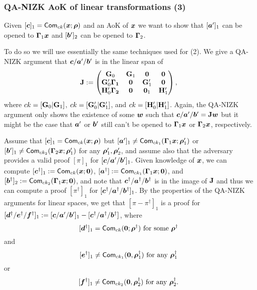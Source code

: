 \subsubsection{QA-NIZK AoK of linear transformations (3)}
Given $[{\boldsymbol{c}}]_1=\mathsf{Com}_{ck}({\boldsymbol{x}};{\boldsymbol{\rho}})$ and an AoK of ${\boldsymbol{x}}$ we want to show that $[{\boldsymbol{a}}']_1$ can be opened to $\mathbf{{\Gamma}}_1{\boldsymbol{x}}$ and $[{\boldsymbol{b}}']_2$ can be opened to $\mathbf{{\Gamma}}_2$.

To do so we will use essentially the same techniques used for (2). We give a QA-NIZK argument that ${\boldsymbol{c}}/{\boldsymbol{a}}'/{\boldsymbol{b}}'$ is in the linear span of
$$
\mathbf{{J}}:=
\begin{pmatrix}
\mathbf{{G}}_0                              & \mathbf{{G}}_1 & \mathbf{{0}}      & \mathbf{{0}} \\
\mathbf{{G}}'_0\mathbf{{\Gamma_1}}& \mathbf{{0}}     & \mathbf{{G}}'_1 & \mathbf{{0}} \\
\mathbf{{H}}'_0\mathbf{{\Gamma_2}}& \mathbf{{0}}    & \mathbf{{0}}_1   & \mathbf{{H}}'_1 
\end{pmatrix},
$$
where $ck=[\mathbf{{G}}_0|\mathbf{{G}}_1]$, $ck=[\mathbf{{G}}'_0|\mathbf{{G}}'_1]$, and $ck=[\mathbf{{H}}'_0|\mathbf{{H}}'_1]$.
Again, the QA-NIZK argument only shows the existence of some ${\boldsymbol{w}}$ such that ${\boldsymbol{c}}/{\boldsymbol{a}}'/{\boldsymbol{b}}' = \mathbf{{J}}{\boldsymbol{w}}$ but it might be the case that ${\boldsymbol{a}}'$ or ${\boldsymbol{b}}'$ still can't be opened to $\mathbf{{\Gamma}}_1{\boldsymbol{x}}$ or  $\mathbf{{\Gamma}}_2{\boldsymbol{x}}$, respectively.

Assume that $[{\boldsymbol{c}}]_1 = \mathsf{Com}_{ck}({\boldsymbol{x}};{\boldsymbol{\rho}})$ but $[{\boldsymbol{a}}']_1\neq \mathsf{Com}_{ck_1}(\mathbf{{\Gamma}}_1{\boldsymbol{x}};{\boldsymbol{\rho}}'_1)$ or $[{\boldsymbol{b}}']_1\neq \mathsf{Com}_{ck_2}(\mathbf{{\Gamma}}_2{\boldsymbol{x}};{\boldsymbol{\rho}}'_1)$ for any ${\boldsymbol{\rho}}'_1,{\boldsymbol{\rho}}'_2$, and assume also that the adversary provides a valid proof $[\pi]_1$ for $[{\boldsymbol{c}}/{\boldsymbol{a}}'/{\boldsymbol{b}}']_1$. Given knowledge of ${\boldsymbol{x}}$, we can compute $[{\boldsymbol{c}}^\dag]_1:=\mathsf{Com}_{ck}({\boldsymbol{x}};{\boldsymbol{0}})$, $[{\boldsymbol{a}}^\dag]:=\mathsf{Com}_{ck_1}(\mathbf{{\Gamma}}_1{\boldsymbol{x}};{\boldsymbol{0}})$, and $[{\boldsymbol{b}}^\dag]_2:=\mathsf{Com}_{ck_2}(\mathbf{{\Gamma}}_1{\boldsymbol{x}};{\boldsymbol{0}})$, and note that ${\boldsymbol{c}}^\dag/{\boldsymbol{a}}^\dag/{\boldsymbol{b}}^\dag$ is in the image of $\mathbf{{J}}$ and thus we can compute a proof $[\pi^\dag]_1$ for $[{\boldsymbol{c}}^\dag/{\boldsymbol{a}}^\dag/{\boldsymbol{b}}^\dag]_1$. By the properties of the QA-NIZK arguments for linear spaces, we get that $[\pi-\pi^\dag]_1$ is a proof for $[{\boldsymbol{d}}^\dag/{\boldsymbol{e}}^\dag/{\boldsymbol{f}}^\dag]_1:=[{\boldsymbol{c}}/{\boldsymbol{a}}'/{\boldsymbol{b}}']_1-[{\boldsymbol{c}}^\dag/{\boldsymbol{a}}^\dag/{\boldsymbol{b}}^\dag]$, where
$$[{\boldsymbol{d}}^\dag]_1 = \mathsf{Com}_{ck}({\boldsymbol{0}};{\boldsymbol{\rho}}^\dag)\text{ for some }{\boldsymbol{\rho}}^\dag$$
and
$$[{\boldsymbol{e}}^\dag]_1 \neq\mathsf{Com}_{ck_1}({\boldsymbol{0}},{\boldsymbol{\rho}}^\dag_1) \text{ for any }{\boldsymbol{\rho}}^\dag_1$$ 
or
$$[{\boldsymbol{f}}^\dag]_1 \neq\mathsf{Com}_{ck_2}({\boldsymbol{0}},{\boldsymbol{\rho}}^\dag_2) \text{ for any }{\boldsymbol{\rho}}_2^\dag.$$

